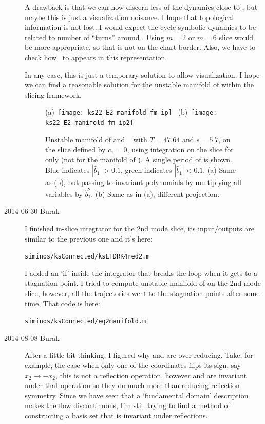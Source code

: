 \begin{description}
A drawback is that we can now discern less of the dynamics close to , but maybe
this is just a visualization noisance. I hope that topological information is not
lost. I would expect the cycle symbolic dynamics to be related to number of ``turns''
around . Using $m=2$ or $m=6$ slice would be more appropriate, so that  is
not on the chart border.
Also, we have to check how \hec\ to  appears in this representation.

In any case, this is just a temporary solution to allow visualization.
I hope we can find a reasonable solution
for the unstable manifold of  within the slicing framework.

\begin{figure}[ht!]
\begin{center}
(a)~\texttt{[image: ks22\_E2\_manifold\_fm\_ip]}~
(b)~\texttt{[image: ks22\_E2\_manifold\_fm\_ip2]}~
\end{center}
\caption{
Unstable manifold of  and \rpo\  with $T=47.64$ and $s=5.7$,
on the slice defined by $c_1=0$, using integration on the slice for  only
(not for the manifold of ).
A single period of  is shown. Blue indicates $|\hat{b}_1|>0.1$, green indicates
 $|\hat{b}_1|<0.1$.
(a) Same as (b), but passing to invariant
polynomials by multiplying all variables by  $\hat{b}_1^2$.
(b) Same as in (a), different projection.
       }
\label{f:ks22_E2_manifold_slice1_rpo4764_ip}
\end{figure}

\item[2014-06-30 Burak] I finished in-slice integrator for the 2nd mode slice,
its input/outputs are similar to the previous one and it's here:

\texttt{siminos/ksConnected/ksETDRK4red2.m}

I added an `if' inside the integrator that breaks the loop when it gets to a
stagnation point. I tried to compute unstable manifold of  on the 2nd
mode slice, however, all the trajectories went to the stagnation points after
some time. That code is here:

\texttt{siminos/ksConnected/eq2manifold.m}

\item[2014-08-08 Burak] After a little bit thinking, I figured why
 and 
are over-reducing. Take, for example, the case when only one of the coordinates
flips its sign, say $x_2 \rightarrow -x_2$, this is not a reflection operation,
however  and  are invariant under that operation
so they do much more than reducing reflection symmetry. Since we have seen that a
`fundamental domain' description makes the flow discontinuous, I'm still trying
to find a method of constructing a basis set that is invariant under reflections.


\end{description}
